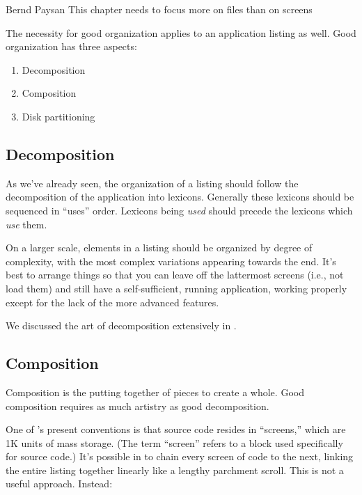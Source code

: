 \begin{tfnote}{Bernd Paysan}
This chapter needs to focus more on files than on screens
\end{tfnote}


The necessity for good organization applies to an application listing
as well.  Good organization has three aspects:

\begin{enumerate}\parsep=0pt\itemsep=0pt
\item Decomposition
\item Composition
\item Disk partitioning
\end{enumerate}

\subsection{Decomposition}%
%
As we've already seen, the organization of a listing should follow the
decomposition of the application into lexicons.  Generally these
lexicons should be sequenced in ``uses'' order.  Lexicons being
\emph{used} should precede the lexicons which \emph{use} them.%

On a larger scale, elements in a listing should be organized by degree
of complexity, with the most complex variations appearing towards the
end.  It's best to arrange things so that you can leave off the
lattermost screens (i.e., not load them) and still have a
self-sufficient, running application, working properly except for the
lack of the more advanced features.

We discussed the art of decomposition extensively in .%

\subsection{Composition}%
%
%

Composition is the putting together of pieces to create a whole.  Good
composition requires as much artistry as good decomposition.

One of \Forth{}'s present conventions is that source code resides in
``screens,'' which are 1K units of mass storage.  (The term ``screen''
refers to a block used specifically for source code.) It's possible in
\Forth{} to chain every screen of code to the next, linking the entire
listing together linearly like a lengthy parchment scroll.  This is
not a useful approach.  Instead:

